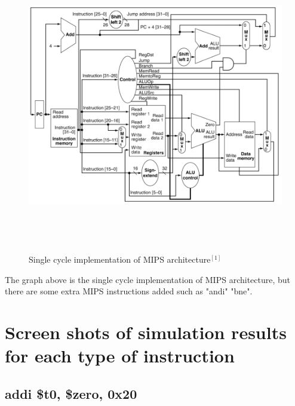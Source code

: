 \documentclass{article}
\begin{document}
\begin{figure}[H]
    \centering
    \includegraphics[height = 13cm,width = 16cm]{single_cycle.png}
    \caption{Single cycle implementation of MIPS architecture$^{[1]}$}
    \label{fig:my_label}
\end{figure}

The graph above is the single cycle implementation of MIPS architecture, but there are some extra MIPS instructions added such as "andi" "bne".

\section{Screen shots of simulation results for each type of instruction}

\subsection{addi \$t0, \$zero, 0x20}
\end{document}
